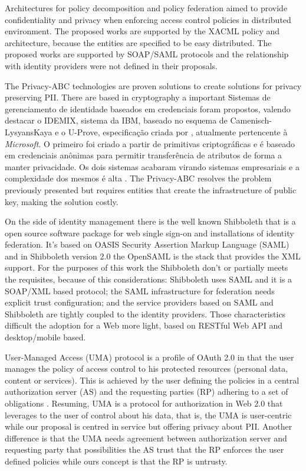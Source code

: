 \documentclass{doublecol-new}
\begin{document}
Architectures for policy decomposition \cite{lin2008policy} and policy federation \cite{decat2012toward,decat2013federated,decat2014middleware} aimed to provide confidentiality and privacy when enforcing access control policies in distributed environment. The proposed works are supported by the XACML policy and architecture, because the entities are specified to be easy distributed. The proposed works are supported by SOAP/SAML protocols and the relationship with identity providers were not defined in their proposals. 

The Privacy-ABC technologies are proven solutions to create solutions for privacy preserving PII. There are based in cryptography a important 
Sistemas de gerenciamento de identidade baseados em credenciais foram propostos, valendo destacar o IDEMIX\cite{camenisch2002design}, sistema da IBM, baseado no esquema de Camenisch-LysyansKaya \cite{camenisch2001efficient} e o U-Prove, especificação criada por \cite{brands2000rethinking}, atualmente pertencente à \textit{Microsoft}. O primeiro foi criado a partir de primitivas criptográficas e é baseado em credenciais anônimas para permitir transferência de atributos de forma a manter privacidade. Os dois sistemas acabaram virando sistemas empresariais e a complexidade dos mesmos é alta \cite{nogueira2014aprimoramento}. The Privacy-ABC resolves the problem previously presented but requires entities that create the infrastructure of public key, making the solution costly.

On the side of identity management there is the well known Shibboleth \cite{erdos2002shibboleth} that is a open source software package for web single sign-on and installations of identity federation. It's based on OASIS Security Assertion Markup Language (SAML) and in Shibboleth version 2.0 the OpenSAML is the stack that provides the XML support. For the purposes of this work the Shibboleth don't or partially meets the requisites, because of this considerations: Shibboleth uses SAML and it is a SOAP/XML based protocol; the SAML infrastructure for federation needs explicit trust configuration; and the service providers based on SAML and Shibboleth are tightly coupled to the identity providers. Those characteristics difficult the adoption for a Web more light, based on RESTful Web API and desktop/mobile based.

User-Managed Access (UMA)\cite{hardjono-oauth-umacore-14,machulak2010user} protocol is a profile of OAuth 2.0 in that the user manages the policy of access control to his protected resources (personal data, content or services). This is achieved by the user defining the policies in a central authorization server (AS) and the requesting parties (RP) adhering to a set of obligations \citep{maler-oauth-umatrust-03}. Resuming, UMA is a protocol for authorization in Web 2.0 that leverages to the user of control about his data, that is, the UMA is user-centric while our proposal is centred in service but offering privacy about PII. Another difference is that the UMA needs agreement between authorization server and requesting party that possibilities the AS trust that the RP enforces the user defined policies while ours concept is that the RP is untrusty.
\end{document}

